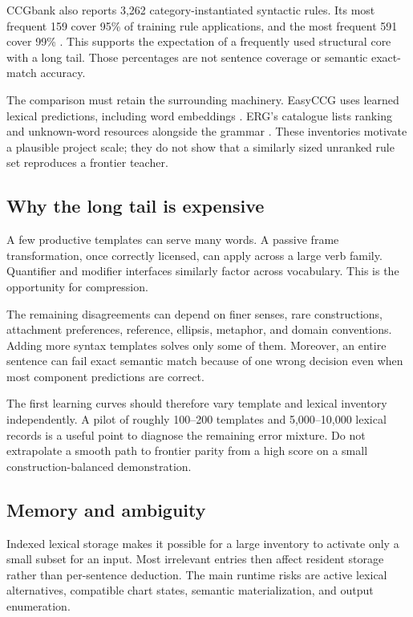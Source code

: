 \documentclass[11pt,a4paper]{article}
\begin{document}
CCGbank also reports 3,262 category-instantiated syntactic rules. Its most
frequent 159 cover 95\% of training rule applications, and the most frequent
591 cover 99\% \cite{ccgbank}. This supports the expectation of a frequently
used structural core with a long tail. Those percentages are not sentence
coverage or semantic exact-match accuracy.

The comparison must retain the surrounding machinery. EasyCCG uses learned
lexical predictions, including word embeddings \cite{easyccg}. ERG's
catalogue lists ranking and unknown-word resources alongside the grammar
\cite{ergcatalogue}. These inventories motivate a plausible project scale;
they do not show that a similarly sized unranked rule set reproduces a
frontier teacher.

\subsection{Why the long tail is expensive}
A few productive templates can serve many words. A passive frame
transformation, once correctly licensed, can apply across a large verb
family. Quantifier and modifier interfaces similarly factor across vocabulary.
This is the opportunity for compression.

The remaining disagreements can depend on finer senses, rare constructions,
attachment preferences, reference, ellipsis, metaphor, and domain conventions.
Adding more syntax templates solves only some of them. Moreover, an entire
sentence can fail exact semantic match because of one wrong decision even
when most component predictions are correct.

The first learning curves should therefore vary template and lexical
inventory independently. A pilot of roughly 100--200 templates and
5,000--10,000 lexical records is a useful point to diagnose the remaining
error mixture. Do not extrapolate a smooth path to frontier parity from a
high score on a small construction-balanced demonstration.

\subsection{Memory and ambiguity}
Indexed lexical storage makes it possible for a large inventory to activate
only a small subset for an input. Most irrelevant entries then affect
resident storage rather than per-sentence deduction. The main runtime risks
are active lexical alternatives, compatible chart states, semantic
materialization, and output enumeration.
\end{document}
